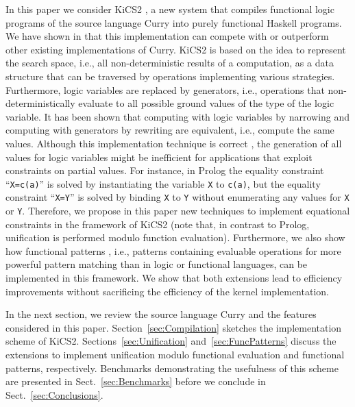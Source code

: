 \documentclass{llncs}
\newcommand{\code}[1]{\mbox{\small\texttt{#1}}}
\newcommand{\ccode}[1]{``\code{#1}''}
\begin{document}
In this paper we consider KiCS2 \cite{BrasselHanusPeemoellerReck11},
a new system that compiles functional logic programs of the
source language Curry \cite{Hanus06Curry}
into purely functional Haskell programs.
We have shown in \cite{BrasselHanusPeemoellerReck11}
that this implementation can compete with or outperform
other existing implementations of Curry.
KiCS2 is based on the idea to represent
the search space, i.e., all non-deterministic results of a computation,
as a data structure that can be traversed by operations
implementing various strategies.
Furthermore, logic variables are replaced by generators,
i.e., operations that non-deterministically evaluate to
all possible ground values of the type of the logic variable.
It has been shown \cite{AntoyHanus06ICLP}
that computing with logic variables by narrowing \cite{Reddy85,Slagle74}
and computing with generators by rewriting
are equivalent, i.e., compute the same values.
Although this implementation technique is correct \cite{Brassel11Thesis},
the generation of all values for logic variables
might be inefficient for applications that
exploit constraints on partial values.
For instance, in Prolog the equality constraint \ccode{X=c(a)}
is solved by instantiating the variable \code{X} to \code{c(a)},
but the equality constraint \ccode{X=Y} is solved by binding \code{X}
to \code{Y} without enumerating any values for \code{X} or \code{Y}.
Therefore, we propose in this paper new techniques
to implement equational constraints in the framework of KiCS2
(note that, in contrast to Prolog, unification is performed
modulo function evaluation).
Furthermore, we also show how functional patterns \cite{AntoyHanus05LOPSTR},
i.e., patterns containing evaluable operations for more powerful pattern 
matching than in logic or functional languages,
can be implemented in this framework.
We show that both extensions lead to efficiency improvements
without sacrificing the efficiency of the kernel implementation.

In the next section, we review the source language Curry
and the features considered in this paper.
Section~\ref{sec:Compilation} sketches the implementation scheme
of KiCS2.
Sections~\ref{sec:Unification} and~\ref{sec:FuncPatterns}
discuss the extensions to implement unification modulo
functional evaluation and functional patterns, respectively.
Benchmarks demonstrating the usefulness of this scheme
are presented in Sect.~\ref{sec:Benchmarks}
before we conclude in Sect.~\ref{sec:Conclusions}.
\end{document}
